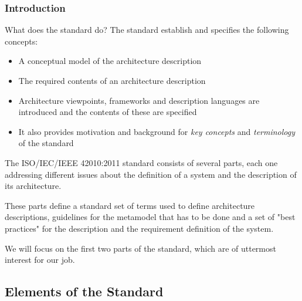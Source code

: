 		\begin{frame}
		\frametitle{Introduction}	
			\begin{block}{What does the standard do?}
			\vspace{0.3cm}
				The standard establish and specifies the following concepts:
				\begin{itemize}\vspace{0.3cm}
					\item A conceptual model of the architecture description\vspace{0.3cm}
					\item The required contents of an architecture description\vspace{0.3cm}
					\item Architecture viewpoints, frameworks and description languages are introduced and the contents of these are specified\vspace{0.3cm}
					\item It also provides motivation and background for \emph{key concepts} and \emph{terminology} of the standard\vspace{0.3cm}
				\end{itemize}			
			\end{block}
		\end{frame}
		
		\begin{frame}
		\vspace{0.3cm}
			The ISO/IEC/IEEE 42010:2011 standard consists of several parts, each one addressing different issues about the definition of a system and the description of its architecture.
			\newline\newline
			
			These parts define a standard set of terms used to define architecture descriptions, guidelines for the metamodel that has to be done and a set of "best practices" for the description and the requirement definition of the system.
			\newline\newline
			
		We will focus on the first two parts of the standard, which are of uttermost interest for our job.
		
		\end{frame}
		
		\subsection{Elements of the Standard}
		
